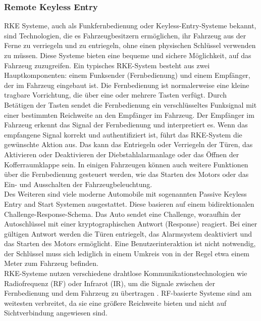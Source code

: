 \subsubsection{Remote Keyless Entry}
\ac{RKE} Systeme, auch als Funkfernbedienung oder Keyless-Entry-Systeme bekannt, sind Technologien, die es Fahrzeugbesitzern ermöglichen, ihr Fahrzeug aus der Ferne zu verriegeln und zu entriegeln, ohne einen physischen Schlüssel verwenden zu müssen. Diese Systeme bieten eine bequeme und sichere Möglichkeit, auf das Fahrzeug zuzugreifen.
Ein typisches RKE-System besteht aus zwei Hauptkomponenten: einem Funksender (Fernbedienung) und einem Empfänger, der im Fahrzeug eingebaut ist. Die Fernbedienung ist normalerweise eine kleine tragbare Vorrichtung, die über eine oder mehrere Tasten verfügt. Durch Betätigen der Tasten sendet die Fernbedienung ein verschlüsseltes Funksignal mit einer bestimmten Reichweite an den Empfänger im Fahrzeug.
Der Empfänger im Fahrzeug erkennt das Signal der Fernbedienung und interpretiert es. Wenn das empfangene Signal korrekt und authentifiziert ist, führt das RKE-System die gewünschte Aktion aus. Das kann das Entriegeln oder Verriegeln der Türen, das Aktivieren oder Deaktivieren der Diebstahlalarmanlage oder das Öffnen der Kofferraumklappe sein. In einigen Fahrzeugen können auch weitere Funktionen über die Fernbedienung gesteuert werden, wie das Starten des Motors oder das Ein- und Ausschalten der Fahrzeugbeleuchtung.\\
Des Weiteren sind viele moderne Automobile mit sogenannten Passive Keyless Entry and Start Systemen ausgestattet. Diese basieren auf einem bidirektionalen Challenge-Response-Schema. Das Auto sendet eine Challenge, woraufhin der Autoschlüssel mit einer kryptographischen Antwort (Response) reagiert. Bei einer gültigen Antwort werden die Türen entriegelt, das Alarmsystem deaktiviert und das Starten des Motors ermöglicht. Eine Benutzerinteraktion ist nicht notwendig, der Schlüssel muss sich lediglich in einem Umkreis von in der Regel etwa einem Meter zum Fahrzeug befinden. \cite[930]{Garcia.2016} \\
RKE-Systeme nutzen verschiedene drahtlose Kommunikationstechnologien wie Radiofrequenz (RF) oder Infrarot (IR), um die Signale zwischen der Fernbedienung und dem Fahrzeug zu übertragen \cite[4]{Checkoway.2011}. RF-basierte Systeme sind am weitesten verbreitet, da sie eine größere Reichweite bieten und nicht auf Sichtverbindung angewiesen sind.

